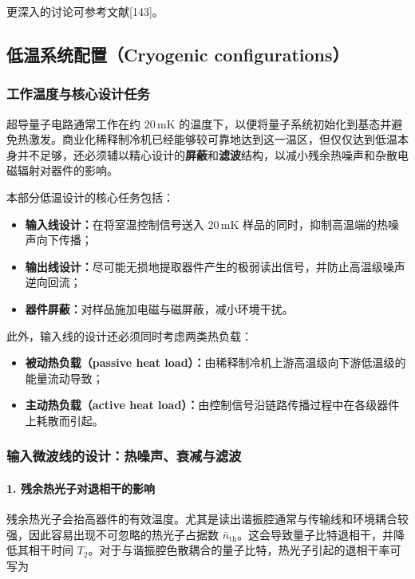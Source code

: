 \documentclass[12pt,a4paper,oneside]{ctexbook}
\begin{document}
更深入的讨论可参考文献[143]。

\subsection{低温系统配置（Cryogenic configurations）}

\subsubsection{工作温度与核心设计任务}

超导量子电路通常工作在约 $20\,\mathrm{mK}$ 的温度下，以便将量子系统初始化到基态并避免热激发。商业化稀释制冷机已经能够较可靠地达到这一温区，但仅仅达到低温本身并不足够，还必须辅以精心设计的\textbf{屏蔽}和\textbf{滤波}结构，以减小残余热噪声和杂散电磁辐射对器件的影响。

本部分低温设计的核心任务包括：

\begin{itemize}
    \item \textbf{输入线设计：}在将室温控制信号送入 $20\,\mathrm{mK}$ 样品的同时，抑制高温端的热噪声向下传播；
    \item \textbf{输出线设计：}尽可能无损地提取器件产生的极弱读出信号，并防止高温级噪声逆向回流；
    \item \textbf{器件屏蔽：}对样品施加电磁与磁屏蔽，减小环境干扰。
\end{itemize}

此外，输入线的设计还必须同时考虑两类热负载：

\begin{itemize}
    \item \textbf{被动热负载（passive heat load）：}由稀释制冷机上游高温级向下游低温级的能量流动导致；
    \item \textbf{主动热负载（active heat load）：}由控制信号沿链路传播过程中在各级器件上耗散而引起。
\end{itemize}

\subsubsection{输入微波线的设计：热噪声、衰减与滤波}

\paragraph{1. 残余热光子对退相干的影响}

残余热光子会抬高器件的有效温度。尤其是读出谐振腔通常与传输线和环境耦合较强，因此容易出现不可忽略的热光子占据数 $\bar n_{\mathrm{th}}$。这会导致量子比特退相干，并降低其相干时间 $T_2$。对于与谐振腔色散耦合的量子比特，热光子引起的退相干率可写为
\end{document}
